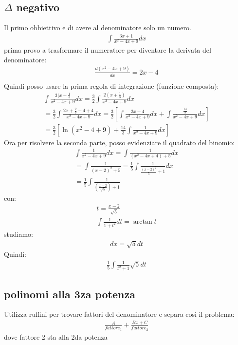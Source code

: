 \documentclass{article}
\begin{document}
\subsection{$\Delta$ negativo}
Il primo obbiettivo e di avere al denominatore solo un numero.
\begin{gather*}
		\int \frac{3x+1}{x^2-4x+9}dx
\end{gather*}
prima provo a trasformare il numeratore per diventare la derivata del denominatore:
\begin{gather*}
		\frac{d(x^2-4x+9)}{dx}=2x-4\\
\end{gather*}
Quindi posso usare la prima regola di integrazione (funzione composta):
\begin{gather*}
		\int \frac{3(x+\frac{1}{3}}{x^2-4x+9}dx=\frac{3}{2}\int \frac{2(x+\frac{1}{3})}{x^2-4x+9}dx\\
		=\frac{3}{2} \int \frac{2x+\frac{2}{3}-4+4}{x^2-4x+9}dx=\frac{3}{2}\left[ \int \frac{2x-4}{x^2-4x+9}dx+ \int \frac{\frac{14}{3}}{x^2-4x+9}dx\right]\\
		=\frac{3}{2}\left[ \ln (x^2-4+9)+\frac{14}{3}\int \frac{1}{x^2-4x+9}dx\right]
\end{gather*}
Ora per risolvere la seconda parte, posso evidenziare il quadrato del binomio:
\begin{gather*}
	\int \frac{1}{x^2-4x+9}dx = \int \frac{1}{(x^2-4x+4)+5}dx\\
	=\int \frac{1}{(x-2)^2+5}=\frac{1}{5}\int \frac{1}{\frac{(x-2)^2}{5}+1}dx\\
=\frac{1}{5} \int \frac{1}{\left( \frac{x-2}{\sqrt{5}}\right) + 1}
\end{gather*}
con:
\begin{gather*}
		t=\frac{x-2}{\sqrt{5}}\\
		\int \frac{1}{1+t^2}dt = \arctan t
\end{gather*}
studiamo:
\begin{gather*}
		dx=\sqrt{5}dt
\end{gather*}
Quindi:
\begin{gather*}
		\frac{1}{5}\int \frac{1}{t^2+1}\sqrt{5}dt
\end{gather*}
\subsection{polinomi alla 3za potenza}
Utilizza ruffini per trovare fattori del denominatore e separa cosi il problema:
\begin{gather*}
		\frac{A}{fattore_{1}}+\frac{Bx +C}{fattore_{2}}
\end{gather*}
dove fattore 2 sta alla 2da potenza
\end{document}
